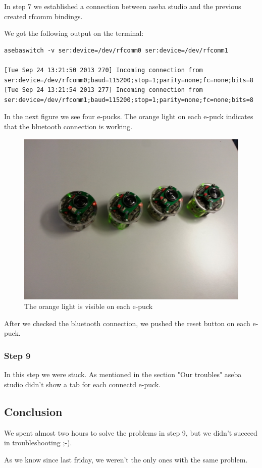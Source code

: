 \documentclass[12pt]{article}
\begin{document}
In step 7 we established a connection between aseba studio and the previous created rfcomm bindings.

We got the following output on the terminal:
\begin{lstlisting}
asebaswitch -v ser:device=/dev/rfcomm0 ser:device=/dev/rfcomm1

[Tue Sep 24 13:21:50 2013 270] Incoming connection from 
ser:device=/dev/rfcomm0;baud=115200;stop=1;parity=none;fc=none;bits=8
[Tue Sep 24 13:21:54 2013 277] Incoming connection from 
ser:device=/dev/rfcomm1;baud=115200;stop=1;parity=none;fc=none;bits=8
\end{lstlisting}
In the next figure we see four e-pucks. The orange light on each e-puck indicates that the bluetooth connection is working. 
\begin{figure}[!htb]
\centering
\includegraphics[scale=0.5]{pics/epucks_2.eps} 
\caption{The orange light is visible on each e-puck}
\end{figure}

After we checked the bluetooth connection, we pushed the reset button on each e-puck.

\subsubsection*{Step 9}
In this step we were stuck. As mentioned in the section "Our troubles" aseba studio didn't show a tab for each connectd e-puck.

\newpage
\subsection*{Conclusion}
We spent almost two hours to solve the problems in step 9, but we didn't succeed in troubleshooting ;-).

As we know since last friday, we weren't the only ones with the same problem.
\end{document}
